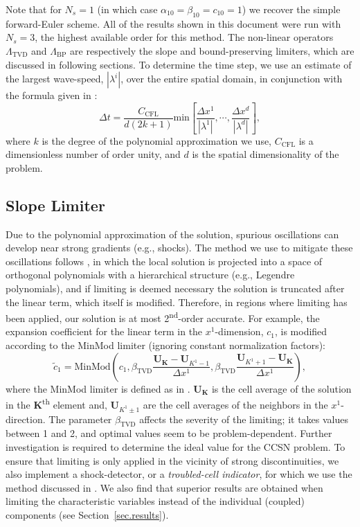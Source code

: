 \documentclass[letterpaper]{jpconf}
\renewcommand{\bs}[1]{\boldsymbol{#1}}
\newcommand{\secref}[1]{Section~\ref{#1}}
\begin{document}
Note that for $N_{s}=1$ (in which case $\alpha_{10}=\beta_{10}=c_{10}=1$) we recover the simple forward-Euler scheme. All of the results shown in this document were run with $N_{s}=3$, the highest available order for this method. The non-linear operators $\Lambda_{\text{TVD}}$ and $\Lambda_{\text{BP}}$ are respectively the slope and bound-preserving limiters, which are discussed in following sections. To determine the time step, we use an estimate of the largest wave-speed, $\left|\lambda^{i}\right|$, over the entire spatial domain, in conjunction with the formula given in \cite{CockburnShu2001}:
\begin{equation}
  \Delta t=\frac{C_{\text{CFL}}}{d\left(2k+1\right)}\text{min}\left[\frac{\Delta x^{1}}{\left|\lambda^{1}\right|},\cdots,\frac{\Delta x^{d}}{\left|\lambda^{d}\right|}\right],
\end{equation}
where $k$ is the degree of the polynomial approximation we use, $C_{\text{CFL}}$ is a dimensionless number of order unity, and $d$ is the spatial dimensionality of the problem.

\subsection{Slope Limiter}
Due to the polynomial approximation of the solution, spurious oscillations can develop near strong gradients (e.g., shocks). The method we use to mitigate these oscillations follows \cite{CockburnShu1998}, in which the local solution is projected into a space of orthogonal polynomials with a hierarchical structure (e.g., Legendre polynomials), and if limiting is deemed necessary the solution is truncated after the linear term, which itself is modified. Therefore, in regions where limiting has been applied, our solution is at most 2\textsuperscript{nd}-order accurate. For example, the expansion coefficient for the linear term in the $x^{1}$-dimension, $c_{1}$, is modified according to the MinMod limiter (ignoring constant normalization factors):
\begin{equation}
\widetilde{c}_{1}=\text{MinMod}\left(c_{1},\beta_{\text{TVD}}\frac{\bs{U}_{\bs{K}}-\bs{U}_{K^{1}-1}}{\Delta x^{1}},\beta_{\text{TVD}}\frac{\bs{U}_{K^{1}+1}-\bs{U}_{\bs{K}}}{\Delta x^{1}}\right),
\end{equation}
where the MinMod limiter is defined as in \cite{CockburnShu1998}. $\bs{U}_{\bs{K}}$ is the cell average of the solution in the $\bs{K}$\textsuperscript{th} element and, $\bs{U}_{K^{1}\pm1}$ are the cell averages of the neighbors in the $x^{1}$-direction. The parameter $\beta_{\text{TVD}}$ affects the severity of the limiting; it takes values between 1 and 2, and optimal values seem to be problem-dependent. Further investigation is required to determine the ideal value for the CCSN problem. To ensure that limiting is only applied in the vicinity of strong discontinuities, we also implement a shock-detector, or a \textit{troubled-cell indicator}, for which we use the method discussed in \cite{FuShu2017}. We also find that superior results are obtained when limiting the characteristic variables \cite{CockburnShu2001} instead of the individual (coupled) components (see \secref{sec.results}).
\end{document}
